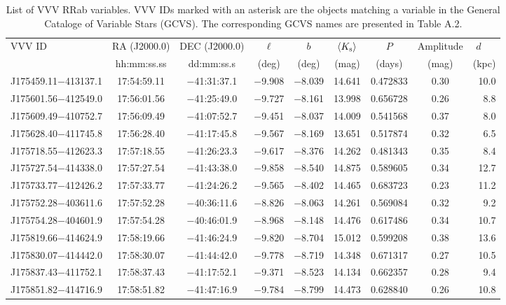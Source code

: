 \begin{table*}[ht!]
\centering
\caption[]{List  of VVV  RRab variables.  {\color{red} VVV  IDs marked
    with  an asterisk  are  the  objects matching  a  variable in  the
    General Cataloge of Variable  Stars (GCVS). The corresponding GCVS
    names are presented in Table A.2.}}
\label{tab:tiles}
\begin{tabular}{lcccccccr}
\hline \hline
VVV ID & RA (J2000.0)  & DEC (J2000.0) & $\ell$ & $b$ &  $\langle K_{\rm s} \rangle$ & $P$ & Amplitude & $d$~~~ \\
     & hh:mm:ss.ss    & dd:mm:ss.s   &  (deg) & (deg) &   (mag)       & (days) & (mag) & (kpc)   \\
\hline
J175459.11$-$413137.1 & 17:54:59.11 & $-$41:31:37.1 & $-$9.908 & $-$8.039 & 14.641 & 0.472833 & 0.30 & 10.0 \\
J175601.56$-$412549.0 & 17:56:01.56 & $-$41:25:49.0 & $-$9.727 & $-$8.161 & 13.998 & 0.656728 & 0.26 & 8.8 \\
J175609.49$-$410752.7 & 17:56:09.49 & $-$41:07:52.7 & $-$9.451 & $-$8.037 & 14.009 & 0.541568 & 0.37 & 8.0 \\
J175628.40$-$411745.8 & 17:56:28.40 & $-$41:17:45.8 & $-$9.567 & $-$8.169 & 13.651 & 0.517874 & 0.32 & 6.5 \\
J175718.55$-$412623.3 & 17:57:18.55 & $-$41:26:23.3 & $-$9.617 & $-$8.376 & 14.262 & 0.481343 & 0.35 & 8.4 \\
J175727.54$-$414338.0 & 17:57:27.54 & $-$41:43:38.0 & $-$9.858 & $-$8.540 & 14.875 & 0.589605 & 0.34 & 12.7 \\
J175733.77$-$412426.2 & 17:57:33.77 & $-$41:24:26.2 & $-$9.565 & $-$8.402 & 14.465 & 0.683723 & 0.23 & 11.2 \\
J175752.28$-$403611.6 & 17:57:52.28 & $-$40:36:11.6 & $-$8.826 & $-$8.063 & 14.261 & 0.569084 & 0.32 & 9.2 \\
J175754.28$-$404601.9 & 17:57:54.28 & $-$40:46:01.9 & $-$8.968 & $-$8.148 & 14.476 & 0.617486 & 0.34 & 10.7 \\
J175819.66$-$414624.9 & 17:58:19.66 & $-$41:46:24.9 & $-$9.820 & $-$8.704 & 15.012 & 0.599208 & 0.38 & 13.6 \\
J175830.07$-$414442.0 & 17:58:30.07 & $-$41:44:42.0 & $-$9.778 & $-$8.719 & 14.348 & 0.671317 & 0.27 & 10.5 \\
J175837.43$-$411752.1 & 17:58:37.43 & $-$41:17:52.1 & $-$9.371 & $-$8.523 & 14.134 & 0.662357 & 0.28 & 9.4 \\
J175851.82$-$414716.9 & 17:58:51.82 & $-$41:47:16.9 & $-$9.784 & $-$8.799 & 14.473 & 0.628840 & 0.26 & 10.8 \\

\end{tabular}
\end{table*}
